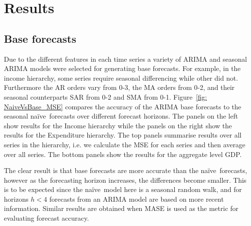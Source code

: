 \documentclass[graybox]{svmult}
\def\naive{na\"{i}ve\ }
\begin{document}
%
%
%
%

\section{Results}\label{sec:results}

\subsection{Base forecasts}

Due to the different features in each time series a variety of ARIMA and seasonal ARIMA models were selected for generating base forecasts. For example, in the income hierarchy, some series require seasonal differencing while other did not. Furthermore the AR orders vary from 0-3, the MA orders from 0-2, and their seasonal counterparts SAR from 0-2 and SMA from 0-1. Figure~\ref{fig: NaiveVsBase_MSE} compares the accuracy of the ARIMA base forecasts to the seasonal \naive forecasts over different forecast horizons.  The panels on the left show results for the Income hierarchy while the panels on the right show the results for the Expenditure hierarchy. The top panels summarise results over all series in the hierarchy, i.e. we calculate the MSE for each series and then average over all series. The bottom panels show the results for the aggregate level GDP.

The clear result is that base forecasts are more accurate than the \naive forecasts, however as the forecasting horizon increases, the differences become smaller. This is to be expected since the \naive model here is a seasonal random walk, and for horizons $h<4$ forecasts from an ARIMA model are based on more recent information. Similar results are obtained when MASE is used as the metric for evaluating forecast accuracy.
\end{document}
